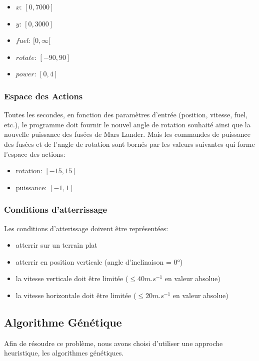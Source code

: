 \documentclass[french,a4paper,10pt,twocolumn]{article}
\begin{document}
\begin{itemize}
    \item $x$: $[0, 7000]$
    \item $y$: $[0, 3000]$
    \item $fuel$: $ [0, \infty [ $ 
    \item $rotate$: $[-90, 90]$
    \item $power$: $[0, 4]$
\end{itemize}

\subsubsection{Espace des Actions}

Toutes les secondes, en fonction des paramètres d’entrée (position, vitesse, fuel, etc.), 
le programme doit fournir le nouvel angle de rotation souhaité ainsi que la nouvelle puissance des fusées de Mars Lander.
Mais les commandes de puissance des fusées et de l’angle de rotation sont bornés par les valeurs suivantes qui forme l'espace des actions:
\begin{itemize}
    \item rotation: $[-15, 15]$ 
    \item puissance: $[-1, 1]$
\end{itemize}

\subsubsection{Conditions d'atterrissage}

Les conditions d'atterissage doivent être représentées:
\begin{itemize}
    \item atterrir sur un terrain plat
    \item atterrir en position verticale (angle d'inclinaison = 0°)
    \item la vitesse verticale doit être limitée ($\le 40m.s^{-1}$ en valeur absolue)
    \item la vitesse horizontale doit être limitée ($\le 20m.s^{-1}$ en valeur absolue)
\end{itemize}

\subsection{Algorithme Génétique}

Afin de résoudre ce problème, nous avons choisi d'utiliser une approche heuristique, les algorithmes génétiques.
\end{document}
